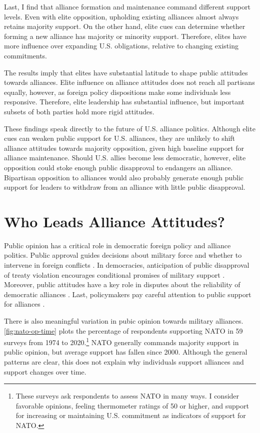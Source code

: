 \documentclass[12pt]{article}
\begin{document}
Last, I find that alliance formation and maintenance command different support levels.
Even with elite opposition, upholding existing alliances almost always retains majority support. 
On the other hand, elite cues can determine whether forming a new alliance has majority or minority support. 
Therefore, elites have more influence over expanding U.S. obligations, relative to changing existing commitments. 


The results imply that elites have substantial latitude to shape public attitudes towards alliances. 
Elite influence on alliance attitudes does not reach all partisans equally, however, as foreign policy dispositions make some individuals less responsive. 
Therefore, elite leadership has substantial influence, but important subsets of both parties hold more rigid attitudes.


These findings speak directly to the future of U.S. alliance politics. 
Although elite cues can weaken public support for U.S. alliances, they are unlikely to shift alliance attitudes towards majority opposition, given high baseline support for alliance maintenance.
Should U.S. allies become less democratic, however, elite opposition could stoke enough public disapproval to endangers an alliance.
Bipartisan opposition to alliances would also probably generate enough public support for leaders to withdraw from an alliance with little public disapproval.  




\section{Who Leads Alliance Attitudes?}

Public opinion has a critical role in democratic foreign policy and alliance politics.
Public approval guides decisions about military force and whether to intervene in foreign conflicts \citep{Tomzetal2020, LinGreenberg2021}. 
In democracies, anticipation of public disapproval of treaty violation encourages conditional promises of military support \citep{Chibaetal2015, FjelstulReiter2019}. 
Moreover, public attitudes have a key role in disputes about the reliability of democratic alliances \citep{Gaubatz1996, GartzkeGleditsch2004}. 
Last, policymakers pay careful attention to public support for alliances \citep{Sayle2019}. 


There is also meaningful variation in pubic opinion towards military alliances. 
\autoref{fig:nato-op-time} plots the percentage of respondents supporting NATO in 59 surveys from 1974 to 2020.\footnote{These surveys ask respondents to assess NATO in many ways. I consider favorable opinions, feeling thermometer ratings of 50 or higher, and support for increasing or maintaining U.S. commitment as indicators of support for NATO.} 
NATO generally commands majority support in public opinion, but average support has fallen since 2000. 
Although the general patterns are clear, this does not explain why individuals support alliances and support changes over time. 
\end{document}
